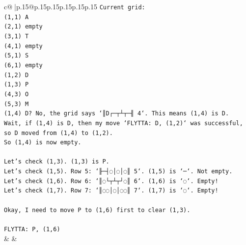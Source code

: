 \documentclass{article}
\begin{document}
{\begin{supertabular}{c@{$\;$}|p{.15\linewidth}@{}p{.15\linewidth}p{.15\linewidth}p{.15\linewidth}p{.15\linewidth}p{.15\linewidth}}
{{{\texttt{Current grid:} \\
\texttt{(1,1) A} \\
\texttt{(2,1) empty} \\
\texttt{(3,1) T} \\
\texttt{(4,1) empty} \\
\texttt{(5,1) S} \\
\texttt{(6,1) empty} \\
\texttt{(1,2) D} \\
\texttt{(1,3) P} \\
\texttt{(4,3) O} \\
\texttt{(5,3) M} \\
\texttt{(1,4) D? No, the grid says `║D┌─┬┴┬─╢ 4`. This means (1,4) is D.} \\
\texttt{Wait, if (1,4) is D, then my move `FLYTTA: D, (1,2)` was successful, so D moved from (1,4) to (1,2).} \\
\texttt{So (1,4) is now empty.} \\
\\ 
\texttt{Let's check (1,3). (1,3) is P.} \\
\texttt{Let's check (1,5). Row 5: `╟─┤◌│◌│◌║ 5`. (1,5) is `─`. Not empty.} \\
\texttt{Let's check (1,6). Row 6: `║◌└┬┴┬┘◌║ 6`. (1,6) is `◌`. Empty!} \\
\texttt{Let's check (1,7). Row 7: `║◌◌│◌│◌◌║ 7`. (1,7) is `◌`. Empty!} \\
\\ 
\texttt{Okay, I need to move P to (1,6) first to clear (1,3).} \\
\\ 
\texttt{FLYTTA: P, (1,6)} \\
            }
        }
    }
    & & \\ \\


\end{supertabular}}
\end{document}
